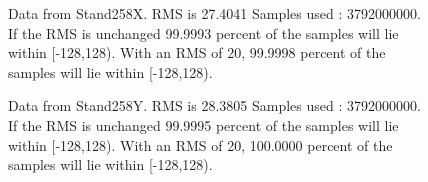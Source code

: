 \begin{figure}[ht] 				 				 				\caption{Data from Stand258X. RMS is 27.4041 Samples used : 3792000000. If the RMS is unchanged 99.9993 percent of the samples will lie within [-128,128).  				 With an RMS of 20, 99.9998 percent of the samples will lie within [-128,128).} 				\end{figure} 

\begin{figure}[ht] 				 				 				\caption{Data from Stand258Y. RMS is 28.3805 Samples used : 3792000000. If the RMS is unchanged 99.9995 percent of the samples will lie within [-128,128).  				 With an RMS of 20, 100.0000 percent of the samples will lie within [-128,128).} 				\end{figure} 

